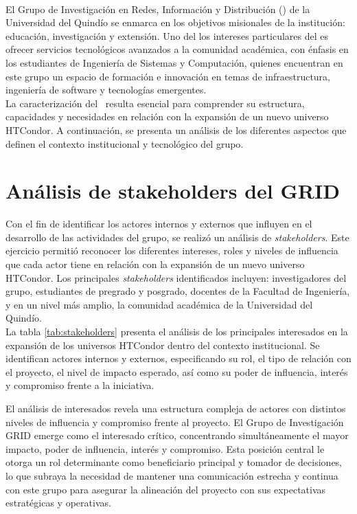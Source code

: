 \label{cap:caracterizacionGRID}
\mbox{}\\
\noindent
El Grupo de Investigación en Redes, Información y Distribución (\GRID) de la Universidad del Quindío se enmarca en los objetivos misionales de la institución: educación, investigación y extensión. Uno del los intereses particulares del \GRID es ofrecer servicios tecnológicos avanzados a la comunidad académica, con énfasis en los estudiantes de Ingeniería de Sistemas y Computación, quienes encuentran en este grupo un espacio de formación e innovación en temas de infraestructura, ingeniería de software y tecnologías emergentes.\\
La caracterización del \GRID\ resulta esencial para comprender su estructura, capacidades y necesidades en relación con la expansión de un nuevo universo HTCondor. A continuación, se presenta un análisis de los diferentes aspectos que definen el contexto institucional y tecnológico del grupo.

\section{Análisis de stakeholders del GRID}
\noindent
Con el fin de identificar los actores internos y externos que influyen en el desarrollo de las actividades del grupo, se realizó un análisis de \textit{stakeholders}. Este ejercicio permitió reconocer los diferentes intereses, roles y niveles de influencia que cada actor tiene en relación con la expansión de un nuevo universo HTCondor. Los principales \textit{stakeholders} identificados incluyen: investigadores del grupo, estudiantes de pregrado y posgrado, docentes de la Facultad de Ingeniería, y en un nivel más amplio, la comunidad académica de la Universidad del Quindío.
\\
\noindent
La tabla \ref{tab:stakeholders} presenta el análisis de los principales interesados en la expansión de los universos HTCondor dentro del contexto institucional. Se identifican actores internos y externos, especificando su rol, el tipo de relación con el proyecto, el nivel de impacto esperado, así como su poder de influencia, interés y compromiso frente a la iniciativa.

El análisis de interesados revela una estructura compleja de actores con distintos niveles de influencia y compromiso frente al proyecto. El Grupo de Investigación GRID emerge como el interesado crítico, concentrando simultáneamente el mayor impacto, poder de influencia, interés y compromiso. Esta posición central le otorga un rol determinante como beneficiario principal y tomador de decisiones, lo que subraya la necesidad de mantener una comunicación estrecha y continua con este grupo para asegurar la alineación del proyecto con sus expectativas estratégicas y operativas.

